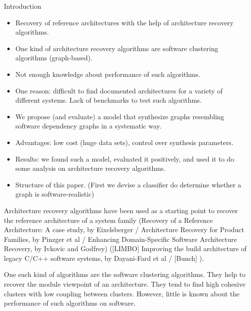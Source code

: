 \documentclass[11pt,twocolumn,a4paper,english]{article}
\begin{document}

\begin{section}{Introduction}

	\begin{itemize}
		\item Recovery of reference architectures with the help of architecture recovery algorithms. 
		\item One kind of architecture recovery algorithms are software clustering algorithms (graph-based).
		\item Not enough knowledge about performance of such algorithms.
		\item One reason: difficult to find documented architectures for a variety of different systems. Lack of benchmarks to test such algorithms.
		\item We propose (and evaluate) a model that synthesize graphs resembling software dependency graphs in a systematic way.
		\item Advantages: low cost (huge data sets), control over synthesis parameters.
		\item Results: we found such a model, evaluated it positively, and used it to do some analysis on architecture recovery algorithms.
		\item Structure of this paper. (First we devise a classifier do determine whether a graph is software-realistic)
	\end{itemize}
		
	Architecture recovery algorithms have been used as a starting point to recover the reference architecture of a system family (Recovery of a Reference Architecture: A case study, by Eixelsberger / Architecture Recovery for Product Families, by Pinzger et al / Enhancing Domain-Specific Software Architecture Recovery, by Ivkovic and Godfrey) 
	([LIMBO] Improving the build architecture of legacy C/C++ software systems, by Dayani-Fard et al / [Bunch] ).
	
	One such kind of algorithms are the software clustering algorithms. They help to recover the module viewpoint of an architecture. They tend to find high cohesive clusters with low coupling between clusters. However, little is known about the performance of such algorithms on software. 
	
\end{section}
\end{document}
